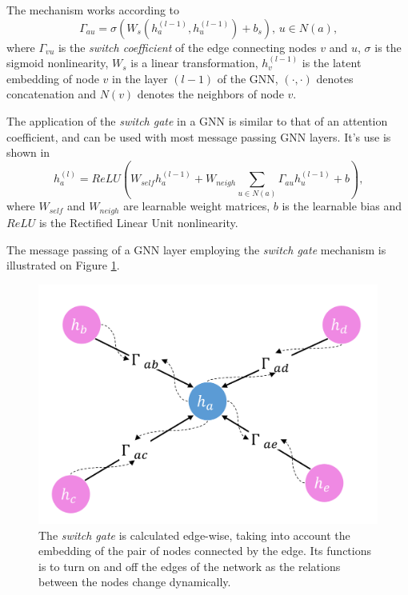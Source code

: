 \documentclass[12pt,a4paper]{article}
\begin{document}
	The mechanism works according to
	\begin{equation}
		\Gamma_{au}=\sigma\left(W_s(h^{(l-1)}_a, h^{(l-1)}_u) + b_s\right)\!\text{, }  u \in N(a)\text{,} \label{switch}
	\end{equation}
	where $\Gamma_{vu}$ is the \emph{switch coefficient} of the edge connecting nodes $v$ and $u$, $\sigma$ is the sigmoid nonlinearity, $W_s$ is a linear transformation, $h^{(l-1)}_v$ is the latent embedding of node $v$ in the layer $(l-1)$ of the GNN, $(\cdot,\cdot)$ denotes concatenation and $N(v)$ denotes the neighbors of node $v$.

	The application of the \emph{switch gate} in a GNN is similar to that of an attention coefficient, and can be used with most message passing GNN layers. It’s use is shown in
	\begin{equation}
	h^{(l)}_a = ReLU\left(W_{self}h^{(l-1)}_a+W_{neigh}\sum_{u \in N(a)}\Gamma_{au}h^{(l-1)}_u + b\right)\text{,} \label{gnn}
	\end{equation}
	where $W_{self}$ and $W_{neigh}$ are learnable weight matrices, $b$ is the learnable bias and $ReLU$ is the Rectified Linear Unit nonlinearity.

	The message passing of a GNN layer employing the \emph{switch gate} mechanism is illustrated on Figure \ref{gate}.

	\begin{figure}[hbtp]
	\centering \includegraphics[scale=0.6]{gnn_w_gate.png}
	\caption{The \emph{switch gate} is calculated edge-wise, taking into account the embedding of the pair of nodes connected by the edge. Its functions is to turn on and off the edges of the network as the relations between the nodes change dynamically. \label{gate}}
	\end{figure}
\end{document}
